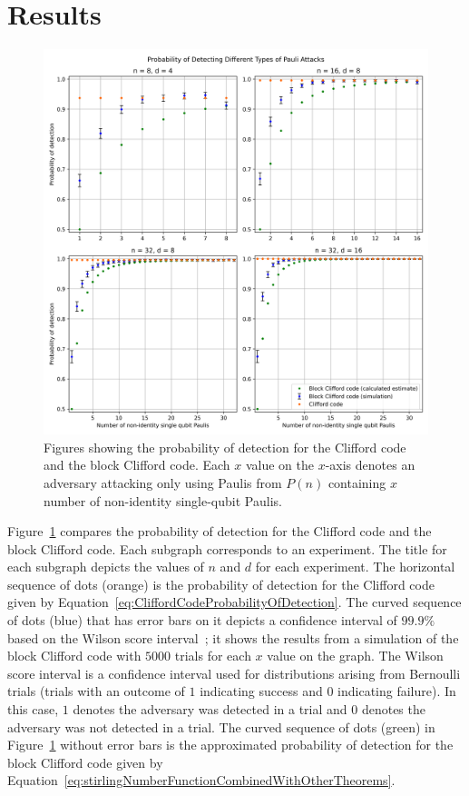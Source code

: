 \section{Results}
\begin{figure}
    \centering
    \includegraphics[scale=0.6]{figures/multi_graph_pauli_attacks.png}
    \caption{Figures showing the probability of detection for the Clifford code and the block Clifford code. Each $x$ value on the $x$-axis denotes an adversary attacking only using Paulis from $P(n)$ containing $x$ number of non-identity single-qubit Paulis.}
    \label{fig:multiGraphPaulAttacks}
\end{figure}

Figure~\ref{fig:multiGraphPaulAttacks} compares the probability of detection for the Clifford code and the block Clifford code. Each subgraph corresponds to an experiment. The title for each subgraph depicts the values of $n$ and $d$ for each experiment. The horizontal sequence of dots (orange) is the probability of detection for the Clifford code given by Equation~\eqref{eq:CliffordCodeProbabilityOfDetection}. The curved sequence of dots (blue) that has error bars on it depicts a confidence interval of $99.9 \%$ based on the Wilson score interval~\cite{wilsonScoreInterval}; it shows the results from a simulation of the block Clifford code with $5000$ trials for each $x$ value on the graph. The Wilson score interval is a confidence interval used for distributions arising from Bernoulli trials (trials with an outcome of $1$ indicating success and $0$ indicating failure). In this case, $1$ denotes the adversary was detected in a trial and $0$ denotes the adversary was not detected in a trial. The curved sequence of dots (green) in Figure~\ref{fig:multiGraphPaulAttacks} without error bars is the approximated probability of detection for the block Clifford code given by Equation~\eqref{eq:stirlingNumberFunctionCombinedWithOtherTheorems}. 

